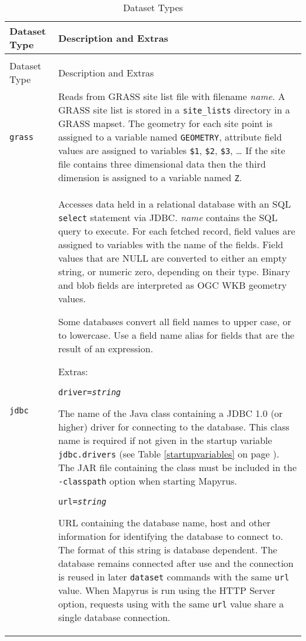 \begin{longtable}{|p{3cm}|p{10cm}|}
\hline
\label{datasettypes}
Dataset Type & Description and Extras \\
\hline
\hline
\endfirsthead
\hline
\caption{Dataset Types} \\
\endfoot

\hline
Dataset Type & Description and Extras \\
\hline
\hline
\endhead

\texttt{grass} &
Reads from GRASS site list file with filename \textit{name}.
A GRASS site list is stored in a \texttt{site\_lists}
directory in a GRASS mapset.
The geometry for each site point is assigned to a variable named
\texttt{GEOMETRY}, attribute field values are assigned to variables
\texttt{\$1}, \texttt{\$2}, \texttt{\$3}, \dots
If the site file contains three dimensional data then the
third dimension is assigned to a variable named \texttt{Z}.  \\

\hline

\texttt{jdbc} &
Accesses data held in a relational database with
an SQL \texttt{select} statement via JDBC.
\textit{name} contains the SQL query to execute.
For each fetched record, field values are assigned to variables
with the name of the fields.
Field values that are NULL are converted to either an empty string,
or numeric zero, depending on their type.
Binary and blob fields are interpreted as OGC WKB geometry values.

Some databases convert all field names to upper case, or to lowercase.
Use a field name alias for fields that are the result of an expression.

\vspace{10pt}
Extras:

\texttt{driver=\textit{string}}

The name of the Java class containing a JDBC 1.0 (or higher)
driver for connecting to the database.
This class name is required if not given in the startup variable
\texttt{jdbc.drivers} (see Table \ref{startupvariables}
on page \pageref{startupvariables}).
The JAR file containing the class must be included in the \texttt{-classpath}
option when starting Mapyrus.

\vspace{10pt}
\texttt{url=\textit{string}}

URL containing the database name, host and other information for identifying
the database to connect to.
The format of this string is database dependent.
The database remains connected after use and the connection is reused in later
\texttt{dataset} commands with the same \texttt{url} value.
When Mapyrus is run using the HTTP Server option,
requests using with the same \texttt{url} value share a
single database connection.


\end{longtable}
